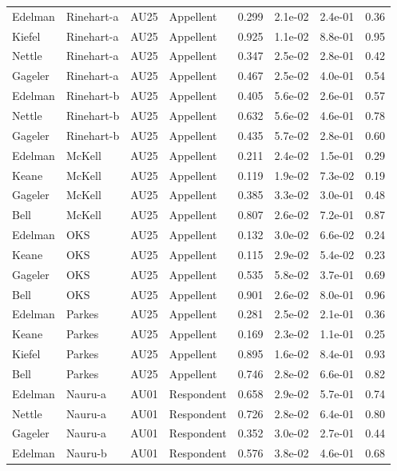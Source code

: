 \documentclass{monashthesis}
\begin{document}
\begin{center}
\begin{longtable}{llllllll}
Edelman & Rinehart-a & AU25 & Appellent & 0.299 & 2.1e-02 & 2.4e-01 & 0.36 \\
Kiefel & Rinehart-a & AU25 & Appellent & 0.925 & 1.1e-02 & 8.8e-01 & 0.95 \\
Nettle & Rinehart-a & AU25 & Appellent & 0.347 & 2.5e-02 & 2.8e-01 & 0.42 \\
Gageler & Rinehart-a & AU25 & Appellent & 0.467 & 2.5e-02 & 4.0e-01 & 0.54 \\
Edelman & Rinehart-b & AU25 & Appellent & 0.405 & 5.6e-02 & 2.6e-01 & 0.57 \\
Nettle & Rinehart-b & AU25 & Appellent & 0.632 & 5.6e-02 & 4.6e-01 & 0.78 \\
Gageler & Rinehart-b & AU25 & Appellent & 0.435 & 5.7e-02 & 2.8e-01 & 0.60 \\
Edelman & McKell & AU25 & Appellent & 0.211 & 2.4e-02 & 1.5e-01 & 0.29 \\
Keane & McKell & AU25 & Appellent & 0.119 & 1.9e-02 & 7.3e-02 & 0.19 \\
Gageler & McKell & AU25 & Appellent & 0.385 & 3.3e-02 & 3.0e-01 & 0.48 \\
Bell & McKell & AU25 & Appellent & 0.807 & 2.6e-02 & 7.2e-01 & 0.87 \\
Edelman & OKS & AU25 & Appellent & 0.132 & 3.0e-02 & 6.6e-02 & 0.24 \\
Keane & OKS & AU25 & Appellent & 0.115 & 2.9e-02 & 5.4e-02 & 0.23 \\
Gageler & OKS & AU25 & Appellent & 0.535 & 5.8e-02 & 3.7e-01 & 0.69 \\
Bell & OKS & AU25 & Appellent & 0.901 & 2.6e-02 & 8.0e-01 & 0.96 \\
Edelman & Parkes & AU25 & Appellent & 0.281 & 2.5e-02 & 2.1e-01 & 0.36 \\
Keane & Parkes & AU25 & Appellent & 0.169 & 2.3e-02 & 1.1e-01 & 0.25 \\
Kiefel & Parkes & AU25 & Appellent & 0.895 & 1.6e-02 & 8.4e-01 & 0.93 \\
Bell & Parkes & AU25 & Appellent & 0.746 & 2.8e-02 & 6.6e-01 & 0.82 \\
Edelman & Nauru-a & AU01 & Respondent & 0.658 & 2.9e-02 & 5.7e-01 & 0.74 \\
Nettle & Nauru-a & AU01 & Respondent & 0.726 & 2.8e-02 & 6.4e-01 & 0.80 \\
Gageler & Nauru-a & AU01 & Respondent & 0.352 & 3.0e-02 & 2.7e-01 & 0.44 \\
Edelman & Nauru-b & AU01 & Respondent & 0.576 & 3.8e-02 & 4.6e-01 & 0.68 \\

\end{longtable}
\end{center}
\end{document}
